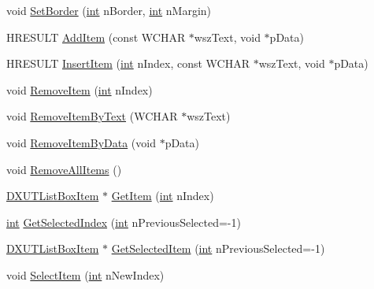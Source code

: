 \begin{DoxyCompactItemize}
\item 
void \hyperlink{class_c_d_x_u_t_list_box_a9886ec7b003a9c218a6b5684d3cc0530}{SetBorder} (\hyperlink{_d_x_u_tgui_8cpp_a2d77ed03302b6978834ee3b6f57837fb}{int} nBorder, \hyperlink{_d_x_u_tgui_8cpp_a2d77ed03302b6978834ee3b6f57837fb}{int} nMargin)
\item 
HRESULT \hyperlink{class_c_d_x_u_t_list_box_aa51de5a656dcaf651fb0d9da497c15f0}{AddItem} (const WCHAR $\ast$wszText, void $\ast$pData)
\item 
HRESULT \hyperlink{class_c_d_x_u_t_list_box_a894dfd0e0df7a8ce39268f067f5d5d06}{InsertItem} (\hyperlink{_d_x_u_tgui_8cpp_a2d77ed03302b6978834ee3b6f57837fb}{int} nIndex, const WCHAR $\ast$wszText, void $\ast$pData)
\item 
void \hyperlink{class_c_d_x_u_t_list_box_a711aeffe979787d579b446ef8f1f47da}{RemoveItem} (\hyperlink{_d_x_u_tgui_8cpp_a2d77ed03302b6978834ee3b6f57837fb}{int} nIndex)
\item 
void \hyperlink{class_c_d_x_u_t_list_box_a2032dd07c99770b04c9d3094d9345055}{RemoveItemByText} (WCHAR $\ast$wszText)
\item 
void \hyperlink{class_c_d_x_u_t_list_box_af9dc3a6d3863fc60d90ec8f68b687d9f}{RemoveItemByData} (void $\ast$pData)
\item 
void \hyperlink{class_c_d_x_u_t_list_box_ae0391a31359ee6dc8d492da493b1c16d}{RemoveAllItems} ()
\item 
\hyperlink{struct_d_x_u_t_list_box_item}{DXUTListBoxItem} $\ast$ \hyperlink{class_c_d_x_u_t_list_box_ae438bf19f4954330d4557c41426df1b6}{GetItem} (\hyperlink{_d_x_u_tgui_8cpp_a2d77ed03302b6978834ee3b6f57837fb}{int} nIndex)
\item 
\hyperlink{_d_x_u_tgui_8cpp_a2d77ed03302b6978834ee3b6f57837fb}{int} \hyperlink{class_c_d_x_u_t_list_box_a719db30025631b50017d7f46e70b76b4}{GetSelectedIndex} (\hyperlink{_d_x_u_tgui_8cpp_a2d77ed03302b6978834ee3b6f57837fb}{int} nPreviousSelected=-\/1)
\item 
\hyperlink{struct_d_x_u_t_list_box_item}{DXUTListBoxItem} $\ast$ \hyperlink{class_c_d_x_u_t_list_box_a35b53b0bd5de2e1dfd0d09c53338f007}{GetSelectedItem} (\hyperlink{_d_x_u_tgui_8cpp_a2d77ed03302b6978834ee3b6f57837fb}{int} nPreviousSelected=-\/1)
\item 
void \hyperlink{class_c_d_x_u_t_list_box_a9951c0e995690bf7821b70c447d49bed}{SelectItem} (\hyperlink{_d_x_u_tgui_8cpp_a2d77ed03302b6978834ee3b6f57837fb}{int} nNewIndex)
\end{DoxyCompactItemize}

